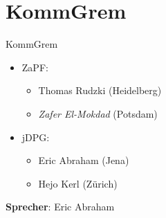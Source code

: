 \documentclass[compress,]{beamer}
\begin{document}
\section{KommGrem}

\begin{frame}{KommGrem}
	\begin{itemize}
		\item[] ZaPF:
			\begin{itemize}
				\item Thomas Rudzki (Heidelberg)
				\item \emph{Zafer El-Mokdad} (Potsdam)
			\end{itemize}
		\item[] jDPG:
			\begin{itemize}
				\item Eric Abraham (Jena)
				\item Hejo Kerl (Zürich)
			\end{itemize}
	\end{itemize}
	\vspace{0.5cm}
	\textbf{Sprecher}: Eric Abraham
\end{frame}
\end{document}
